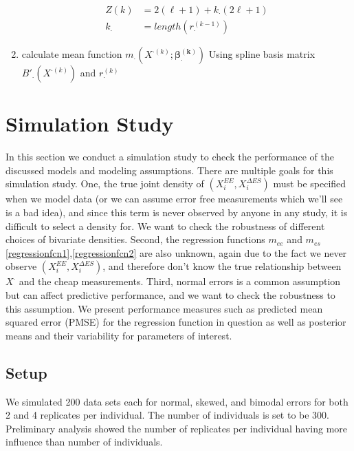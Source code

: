 \documentclass[11pt]{article}\usepackage[]{graphicx}\usepackage[]{color}
\begin{document}
\begin{enumerate}
\begin{align*}
Z(k) &= 2(\ell+1) + k_{\cdot}(2\ell+1) \\
k_{\cdot} &= length(r_{\cdot}^{(k-1)}) 
\end{align*}

\item
calculate mean function $m_{\cdot}(X^{\cdot(k)};\boldsymbol{\beta^{(k)}_{\cdot}})$ Using spline basis matrix $B'_{\cdot}(X^{\cdot(k)})$ and $r_{\cdot}^{(k)}$


\end{enumerate}



\section{Simulation Study}

In this section we conduct a simulation study to check the performance of the discussed models and modeling assumptions. There are multiple goals for this simulation study. One, the true joint density of $(X_i^{EE},X_i^{\Delta ES})$ must be specified when we model data (or we can assume error free measurements which we'll see is a bad idea), and since this term is never observed by anyone in any study, it is difficult to select a density for. We want to check the robustness of different choices of bivariate densities. Second, the regression functions $m_{ee}$ and $m_{es}$ \eqref{regressionfcn1},\eqref{regressionfcn2} are also unknown, again due to the fact we never observe $(X_i^{EE},X_i^{\Delta ES})$, and therefore don't know the true relationship between $X^{\cdot}$ and the cheap measurements. Third, normal errors  is a common assumption but  can affect predictive performance, and we want to check the robustness to this assumption. We present performance measures such as predicted mean squared error (PMSE) for the regression function in question as well as posterior means and their variability for parameters of interest. 


\subsection{Setup}

We simulated 200 data sets each for normal, skewed, and bimodal errors for both 2 and 4 replicates per individual. The number of individuals is set to be 300. Preliminary analysis showed the number of replicates per individual having  more influence than number of individuals. 
\end{document}

